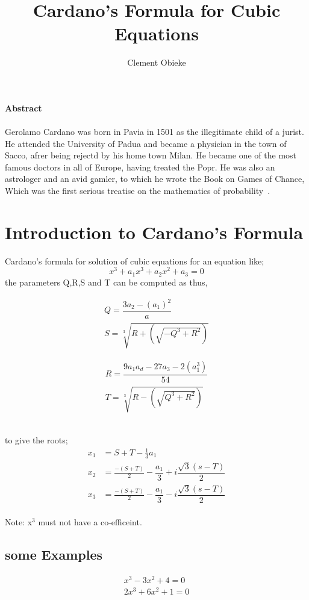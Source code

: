 \documentclass[12pt]{article}
\title{Cardano's Formula for Cubic Equations}
\author{Clement Obieke}
\begin{document}
	\maketitle
	
\centering	\textbf{\large Abstract}
			\paragraph{}
			Gerolamo Cardano was born in Pavia in 1501 as the illegitimate child of a jurist. He attended the University of Padua and became a physician in the town of Sacco, afrer being rejectd by his home town Milan. He became one of the most famous doctors in all of Europe, having treated the Popr. He was also an astrologer and an avid gamler, to which he wrote the Book on Games of Chance, Which was the first serious treatise on the mathematics of probability~\cite{Cardano.S}.

\raggedright
\section{Introduction to Cardano's Formula}

	Cardano's formula for solution of cubic equations for an equation like;\\
	\begin{equation*}
		x^{3} + a_{1}x^{3} +a_{2}x^{2}+a_{3} = 0
	\end{equation*}
	the parameters  Q,R,S and T can be computed as thus,\\
	\begin{minipage}{0.4\linewidth}
			\begin{align*}
			Q=\dfrac{3a_{2}-(a_{1})^{2}}{a}\\
			S=\sqrt[3]{R+(\sqrt{-Q^{3}+R^{2}})}
	 		\end{align*}
 	\end{minipage}
 	\begin{minipage}{0.4\linewidth}
 	\begin{align*}
 		R=\dfrac{9a_{1}a_{d}-27a_{3}-2(a_{1}^{3})}{54}\\ 
 		T=\sqrt[3]{R-(\sqrt{Q^{3}+R^{2}})}
 	\end{align*}
	 \end{minipage}\\
 	to give the roots;\\
 	

 	\begin{align*} 		
 		x_{1}&=S+T-\frac{1}{3}a_{1}\\
 		x_{2}&=\frac{-(S+T)}{2}-\dfrac{a_{1}}{3}+i\dfrac{\sqrt{3}(s-T)}{2} \\  
 		x_{3}&=\frac{-(S+T)}{2}-\dfrac{a_{1}}{3}-i\dfrac{\sqrt{3}(s-T)}{2} 
 	\end{align*}\\
  Note: x$^{3}$ must not have a co-efficeint.

 \subsection{some Examples}

 	\begin{align*}
 		x^{3}-3x^{2}+4 =0\\
 		2x^{3}+6x^{2}+1=0
 	\end{align*}\\
 
 
\end{document}
